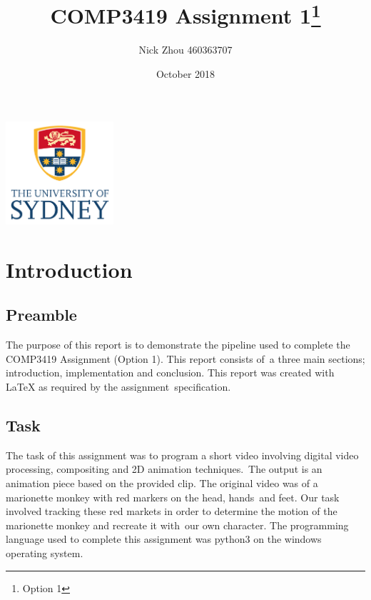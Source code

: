 \documentclass[12pt,a4paper]{article}
\begin{document}
    \begin{titlepage}
        \centering
        \title{COMP3419 Assignment 1\thanks{Option 1}}
        \author{Nick Zhou 460363707}
        \date{October 2018}
        \maketitle
        \centering
        \includegraphics[width=4cm]{usyd}\\[2cm]
    \end{titlepage}

    \begin{tableofcontents}
        \tableofcontents
    \end{tableofcontents}

    \section{Introduction}

      \subsection{Preamble}

      The purpose of this report is to demonstrate the pipeline used to complete the COMP3419 Assignment (Option 1). This report consists of\
      a three main sections; introduction, implementation and conclusion. This report was created with \LaTeX{} as required by the assignment\
      specification.

      \subsection{Task}

      The task of this assignment was to program a short video involving digital video processing, compositing and 2D animation techniques.\
      The output is an animation piece based on the provided clip. The original video was of a marionette monkey with red markers on the head, hands\
      and feet. Our task involved tracking these red markets in order to determine the motion of the marionette monkey and recreate it with\
      our own character. The programming language used to complete this assignment was python3 on the windows operating system.\\
\end{document}
